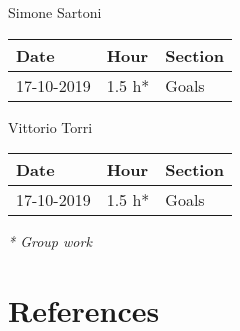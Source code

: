\documentclass[a4paper]{report}
\begin{document}
\begin{center}
Simone Sartoni \\
\begin{tabular}{lll}
\toprule
Date & Hour & Section \\
\midrule
17-10-2019 & 1.5 h* & Goals \\
\bottomrule
\end{tabular}
\end{center}

\begin{center}
Vittorio Torri \\
\begin{tabular}{lll}
\toprule
Date & Hour & Section \\
\midrule
17-10-2019 & 1.5 h* & Goals \\
\bottomrule
\end{tabular}
\end{center}
\textit{* Group work}

\chapter{References}
\lipsum[3]
\end{document}

